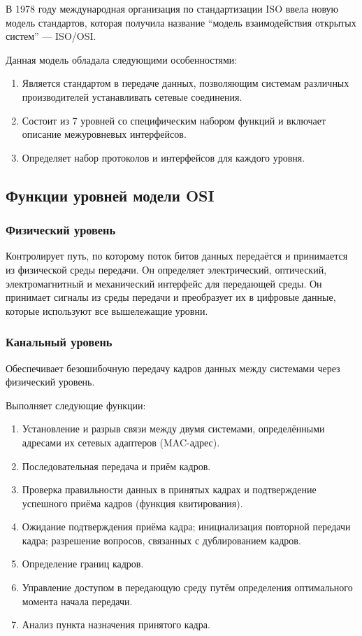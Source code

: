 \documentclass[12pt, russian, oneside, article]{ncc}
\begin{document}
В 1978 году международная организация по стандартизации ISO ввела новую модель стандартов, которая получила название ``модель взаимодействия открытых систем'' --- ISO/OSI.

Данная модель обладала следующими особенностями:
\begin{enumerate}
\item Является стандартом в передаче данных, позволяющим системам различных производителей устанавливать сетевые соединения.
\item Состоит из 7 уровней со специфическим набором функций и включает описание межуровневых интерфейсов.
\item Определяет набор протоколов и интерфейсов для каждого уровня.
\end{enumerate}
\subsection{Функции уровней модели OSI}
\label{sec-1_3}
\subsubsection{Физический уровень}
\label{sec-1_3_1}


Контролирует путь, по которому поток битов данных передаётся и принимается из физической среды передачи. Он определяет электрический, оптический, электромагнитный и механический интерфейс для передающей среды. Он принимает сигналы из среды передачи и преобразует их в цифровые данные, которые используют все вышележащие уровни.
\subsubsection{Канальный уровень}
\label{sec-1_3_2}


Обеспечивает безошибочную передачу кадров данных между системами через физический уровень.

Выполняет следующие функции:
\begin{enumerate}
\item Установление и разрыв связи между двумя системами, определёнными адресами их сетевых адаптеров (MAC-адрес).
\item Последовательная передача и приём кадров.
\item Проверка правильности данных в принятых кадрах и подтверждение успешного приёма кадров (функция квитирования).
\item Ожидание подтверждения приёма кадра; инициализация повторной передачи кадра; разрешение вопросов, связанных с дублированием кадров.
\item Определение границ кадров.
\item Управление доступом в передающую среду путём определения оптимального момента начала передачи.
\item Анализ пункта назначения принятого кадра.
\end{enumerate}
\end{document}
